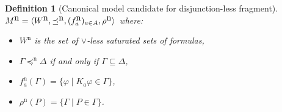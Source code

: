 \documentclass[doctor]{iscs-thesis}
\newtheorem{definition}{Definition}
\begin{document}
\renewcommand{\canon}[1]{#1^{\mbox{n}}}

\begin{definition}[Canonical model candidate for disjunction-less fragment]
 $\canon M =\model{^{\mbox{n}}}$ where:
\begin{itemize}
 \item $\canon W$ is the set of $\vee$-less saturated sets of formulas,
 \item $\Gamma\canon\preceq\Delta$ if and only if $\Gamma\subseteq\Delta$,
 \item $\canon f_a(\Gamma) = \{\varphi\mid{K_a}\varphi\in\Gamma\}$,
 \item $\canon \rho(P) = \{\Gamma\mid P\in\Gamma\}$.
\end{itemize}
\end{definition}
\end{document}
